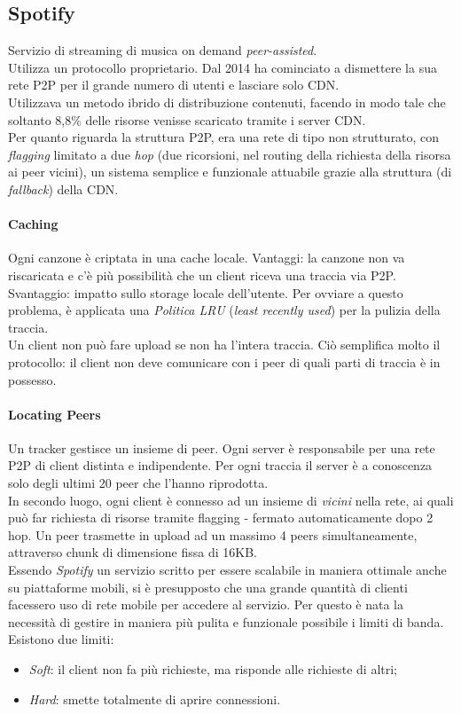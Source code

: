\subsection{Spotify}
Servizio di streaming di musica on demand \textit{peer-assisted}.\\
Utilizza un protocollo proprietario. Dal 2014 ha cominciato a dismettere la sua rete P2P per il grande numero di utenti e lasciare solo CDN. \\
Utilizzava un metodo ibrido di distribuzione contenuti, facendo in modo tale che soltanto 8,8\% delle risorse venisse scaricato tramite i server CDN. \\
Per quanto riguarda la struttura P2P, era una rete di tipo non strutturato, con \textit{flagging} limitato a due \textit{hop} (due ricorsioni, nel routing della richiesta della risorsa ai peer vicini), un sistema semplice e funzionale attuabile grazie alla struttura (di \textit{fallback}) della CDN.

\paragraph{Caching}
Ogni canzone è criptata in una cache locale. Vantaggi: la canzone non va riscaricata e c'è più possibilità che un client riceva una traccia via P2P. Svantaggio: impatto sullo storage locale dell'utente. Per ovviare a questo problema, è applicata una \textit{Politica LRU} (\textit{least recently used}) per la pulizia della traccia. \\
Un client non può fare upload se non ha l'intera traccia. Ciò semplifica molto il protocollo: il client non deve comunicare con i peer di quali parti di traccia è in possesso.

\paragraph{Locating Peers}
Un tracker gestisce un insieme di peer. Ogni server è responsabile per una rete P2P di client distinta e indipendente. Per ogni traccia il server è a conoscenza solo degli ultimi 20 peer che l'hanno riprodotta. \\
In secondo luogo, ogni client è connesso ad un insieme di \textit{vicini} nella rete, ai quali può far richiesta di risorse tramite flagging - fermato automaticamente dopo 2 hop.
Un peer trasmette in upload ad un massimo 4 peers simultaneamente, attraverso chunk di dimensione fissa di 16KB. \\
Essendo \textit{Spotify} un servizio scritto per essere scalabile in maniera ottimale anche su piattaforme mobili, si è presupposto che una grande quantità di clienti facessero uso di rete mobile per accedere al servizio. Per questo è nata la necessità di gestire in maniera più pulita e funzionale possibile i limiti di banda. Esistono due limiti:
\begin{itemize}
    \item \textit{Soft}: il client non fa più richieste, ma risponde alle richieste di altri;
    \item \textit{Hard}: smette totalmente di aprire connessioni.
\end{itemize}


